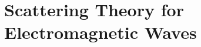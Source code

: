 \documentclass[\main/dresen_thesis.tex]{subfiles}
\begin{document}
\section{Scattering Theory for Electromagnetic Waves}\label{ch:appendix:calculations:scatteringTheoryElectromagneticWaves}
\end{document}
